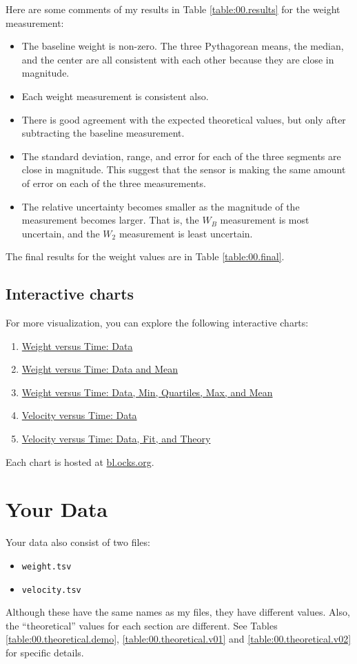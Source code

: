 Here are some comments of my results in Table \ref{table:00.results} for the weight measurement:
\begin{itemize}
    \item The baseline weight is non-zero. The three Pythagorean means, the median, and the center are all consistent with each other because they are close in magnitude.
    \item Each weight measurement is consistent also.
    \item There is good agreement with the expected theoretical values, but only after subtracting the baseline measurement.
    \item The standard deviation, range, and error for each of the three segments are close in magnitude. This suggest that the sensor is making the same amount of error on each of the three measurements.
    \item The relative uncertainty becomes smaller as the magnitude of the measurement becomes larger. That is, the $W_{B}$ measurement is most uncertain, and the $W_{2}$ measurement is least uncertain.
\end{itemize}
The final results for the weight values are in Table \ref{table:00.final}.
%
\subsection{Interactive charts}
%
For more visualization, you can explore the following interactive charts:
\begin{enumerate}
    \item \href{https://bl.ocks.org/meirizarrygelpi/4ff9e1ad0a6c6e7ccee79f7f41a793e6}{Weight versus Time: Data}
    \item \href{https://bl.ocks.org/meirizarrygelpi/1ef52b7ff946234fdc74aa956ccf83c9}{Weight versus Time: Data and Mean}
    \item \href{https://bl.ocks.org/meirizarrygelpi/faf2f927d6886b88b075ff7cdb631b30}{Weight versus Time: Data, Min, Quartiles, Max, and Mean}
    \item \href{https://bl.ocks.org/meirizarrygelpi/fd044bb826a7a8e4f141293fa4a64de9}{Velocity versus Time: Data}
    \item \href{https://bl.ocks.org/meirizarrygelpi/d7a581246c16a7763681e5cad1bcad48}{Velocity versus Time: Data, Fit, and Theory}
\end{enumerate}
Each chart is hosted at \href{https://bl.ocks.org/}{bl.ocks.org}.
%
\section{Your Data}
%
Your data also consist of two files:
\begin{itemize}
    \item \texttt{weight.tsv}
    \item \texttt{velocity.tsv}
\end{itemize}
Although these have the same names as my files, they have different values. Also, the ``theoretical'' values for each section are different. See Tables \ref{table:00.theoretical.demo}, \ref{table:00.theoretical.v01} and \ref{table:00.theoretical.v02} for specific details.
%
\newpage
